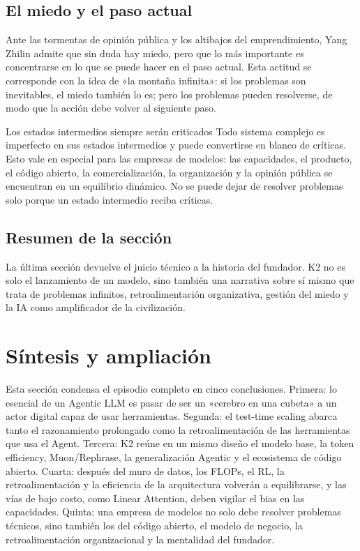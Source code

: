 \documentclass[a4paper]{article}
\begin{document}
\subsection{El miedo y el paso actual}

Ante las tormentas de opinión pública y los altibajos del emprendimiento, Yang Zhilin admite que sin duda hay miedo, pero que lo más importante es concentrarse en lo que se puede hacer en el paso actual. Esta actitud se corresponde con la idea de «la montaña infinita»: si los problemas son inevitables, el miedo también lo es; pero los problemas pueden resolverse, de modo que la acción debe volver al siguiente paso.

\begin{warningbox}{Los estados intermedios siempre serán criticados}
Todo sistema complejo es imperfecto en sus estados intermedios y puede convertirse en blanco de críticas. Esto vale en especial para las empresas de modelos: las capacidades, el producto, el código abierto, la comercialización, la organización y la opinión pública se encuentran en un equilibrio dinámico. No se puede dejar de resolver problemas solo porque un estado intermedio reciba críticas.
\end{warningbox}

\subsection{Resumen de la sección}

La última sección devuelve el juicio técnico a la historia del fundador. K2 no es solo el lanzamiento de un modelo, sino también una narrativa sobre sí mismo que trata de problemas infinitos, retroalimentación organizativa, gestión del miedo y la IA como amplificador de la civilización.
\section{Síntesis y ampliación}

Esta sección condensa el episodio completo en cinco conclusiones. Primera: lo esencial de un Agentic LLM es pasar de ser un «cerebro en una cubeta» a un actor digital capaz de usar herramientas. Segunda: el test-time scaling abarca tanto el razonamiento prolongado como la retroalimentación de las herramientas que usa el Agent. Tercera: K2 reúne en un mismo diseño el modelo base, la token efficiency, Muon/Rephrase, la generalización Agentic y el ecosistema de código abierto. Cuarta: después del muro de datos, los FLOPs, el RL, la retroalimentación y la eficiencia de la arquitectura volverán a equilibrarse, y las vías de bajo costo, como Linear Attention, deben vigilar el bias en las capacidades. Quinta: una empresa de modelos no solo debe resolver problemas técnicos, sino también los del código abierto, el modelo de negocio, la retroalimentación organizacional y la mentalidad del fundador.
\end{document}
